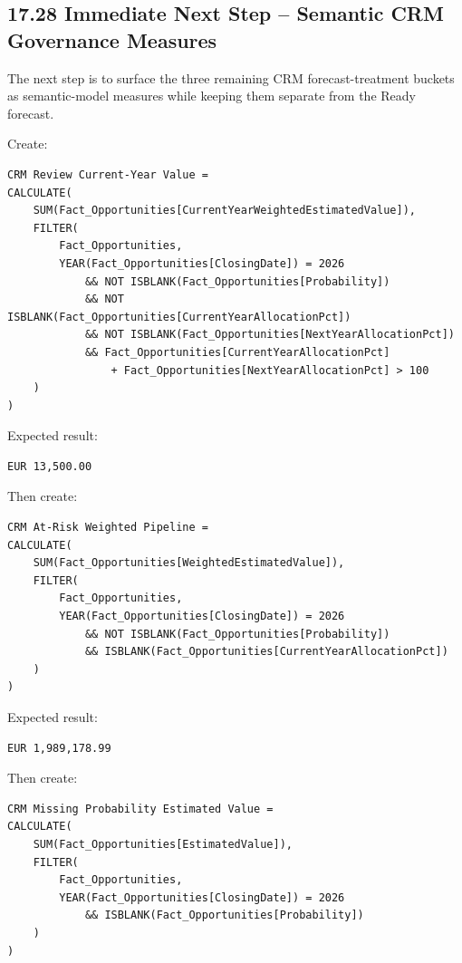 \documentclass[11pt,a4paper]{article}
\begin{document}
\subsection{17.28 Immediate Next Step -- Semantic CRM Governance Measures}

The next step is to surface the three remaining CRM forecast-treatment buckets
as semantic-model measures while keeping them separate from the Ready forecast.

Create:

\begin{lstlisting}[style=powerquery]
CRM Review Current-Year Value =
CALCULATE(
    SUM(Fact_Opportunities[CurrentYearWeightedEstimatedValue]),
    FILTER(
        Fact_Opportunities,
        YEAR(Fact_Opportunities[ClosingDate]) = 2026
            && NOT ISBLANK(Fact_Opportunities[Probability])
            && NOT ISBLANK(Fact_Opportunities[CurrentYearAllocationPct])
            && NOT ISBLANK(Fact_Opportunities[NextYearAllocationPct])
            && Fact_Opportunities[CurrentYearAllocationPct]
                + Fact_Opportunities[NextYearAllocationPct] > 100
    )
)
\end{lstlisting}

Expected result:

\begin{lstlisting}[style=powerquery]
EUR 13,500.00
\end{lstlisting}

Then create:

\begin{lstlisting}[style=powerquery]
CRM At-Risk Weighted Pipeline =
CALCULATE(
    SUM(Fact_Opportunities[WeightedEstimatedValue]),
    FILTER(
        Fact_Opportunities,
        YEAR(Fact_Opportunities[ClosingDate]) = 2026
            && NOT ISBLANK(Fact_Opportunities[Probability])
            && ISBLANK(Fact_Opportunities[CurrentYearAllocationPct])
    )
)
\end{lstlisting}

Expected result:

\begin{lstlisting}[style=powerquery]
EUR 1,989,178.99
\end{lstlisting}

Then create:

\begin{lstlisting}[style=powerquery]
CRM Missing Probability Estimated Value =
CALCULATE(
    SUM(Fact_Opportunities[EstimatedValue]),
    FILTER(
        Fact_Opportunities,
        YEAR(Fact_Opportunities[ClosingDate]) = 2026
            && ISBLANK(Fact_Opportunities[Probability])
    )
)
\end{lstlisting}
\end{document}
